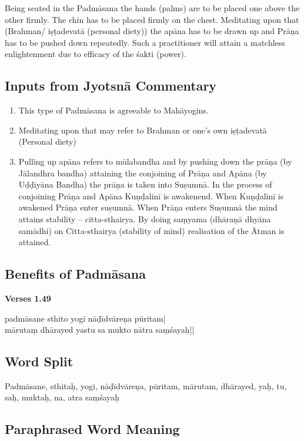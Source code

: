Being seated in the Padmāsana the hands (palms) are to be placed one above the other firmly. The chin has to be placed firmly on the chest. Meditating upon that (Brahman/ iṣṭadevatā (personal diety)) the apāna has to be drawn up and Prāṇa has to be pushed down repeatedly. Such a practitioner will attain a matchless enlightenment due to efficacy of the śakti (power).

\subsection*{Inputs from Jyotsnā Commentary}


\begin{enumerate}
\item This type of Padmāsana is agreeable to Mahāyogins. 
\item Meditating upon that may refer to Brahman or one’s own iṣṭadevatā (Personal diety)
\item Pulling up apāna refers to mūlabandha and by pushing down the prāṇa (by Jālandhra bandha) attaining the conjoining of Prāṇa and Apāna (by Uḍḍiyāna Bandha) the prāṇa is taken into Suṣumnā. In the process of conjoining Prāṇa and Apāna Kuṇḍalinī is awakenend. When Kuṇḍalinī is awakened Prāṇa enter suṣumnā. When Prāṇa enters Suṣumnā the mind attains stability – citta-sthairya. By doing saṃyama (dhāraṇā dhyāna samādhi) on Citta-sthairya (stability of mind) realisation of the Ātman is attained.
\end{enumerate}

\subsection*{Benefits of Padmāsana}


\noindent \textbf{Verses 1.49}

\begin{shloka}
padmāsane sthito yogī nāḍīdvāreṇa pūritam|\\
mārutaṃ dhārayed yastu sa mukto nātra saṃśayaḥ||
\end{shloka}

\subsection*{Word Split}


Padmāsane, sthitaḥ, yogi, nāḍīdvāreṇa, pūritam, mārutam, dhārayed, yaḥ, tu, saḥ, muktaḥ, na, atra saṃśayaḥ

\subsection*{Paraphrased Word Meaning}



